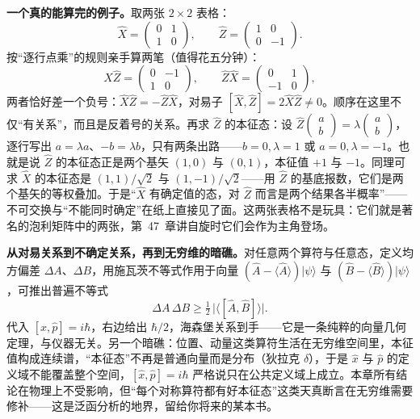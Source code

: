 \begin{mathbridge}
\textbf{一个真的能算完的例子。}取两张 $2\times2$ 表格：
\[
\hat{X}=\begin{pmatrix} 0 & 1 \\ 1 & 0 \end{pmatrix},\qquad
\hat{Z}=\begin{pmatrix} 1 & 0 \\ 0 & -1 \end{pmatrix}.
\]
按“逐行点乘”的规则亲手算两笔（值得花五分钟）：
\[
\hat{X}\hat{Z}=\begin{pmatrix} 0 & -1 \\ 1 & 0 \end{pmatrix},\qquad
\hat{Z}\hat{X}=\begin{pmatrix} 0 & 1 \\ -1 & 0 \end{pmatrix},
\]
两者恰好差一个负号：$\hat{X}\hat{Z}=-\hat{Z}\hat{X}$，对易子 $[\hat{X},\hat{Z}]=2\hat{X}\hat{Z}\neq0$。顺序在这里不仅“有关系”，而且是反着号的关系。再求 $\hat{Z}$ 的本征态：设 $\hat{Z}\begin{pmatrix}a\\b\end{pmatrix}=\lambda\begin{pmatrix}a\\b\end{pmatrix}$，逐行写出 $a=\lambda a$、$-b=\lambda b$，只有两条出路——$b=0,\lambda=1$ 或 $a=0,\lambda=-1$。也就是说 $\hat{Z}$ 的本征态正是两个基矢 $(1,0)$ 与 $(0,1)$，本征值 $+1$ 与 $-1$。同理可求 $\hat{X}$ 的本征态是 $(1,1)/\sqrt2$ 与 $(1,-1)/\sqrt2$——用 $\hat{Z}$ 的基底报数，它们是两个基矢的等权叠加。于是“$\hat{X}$ 有确定值的态，对 $\hat{Z}$ 而言是两个结果各半概率”——不可交换与“不能同时确定”在纸上直接见了面。这两张表格不是玩具：它们就是著名的泡利矩阵中的两张，第~47~章讲自旋时它们会作为主角登场。
\end{mathbridge}

\begin{challenge}
\textbf{从对易关系到不确定关系，再到无穷维的暗礁。}对任意两个算符与任意态，定义均方偏差 $\Delta A$、$\Delta B$，用施瓦茨不等式作用于向量 $(\hat{A}-\langle\hat{A}\rangle)|\psi\rangle$ 与 $(\hat{B}-\langle\hat{B}\rangle)|\psi\rangle$，可推出普遍不等式
\[
\Delta A\,\Delta B\geq\tfrac12\,\bigl|\langle[\hat{A},\hat{B}]\rangle\bigr|.
\]
代入 $[\hat{x},\hat{p}]=i\hbar$，右边给出 $\hbar/2$，海森堡关系到手——它是一条纯粹的向量几何定理，与仪器无关。另一个暗礁：位置、动量这类算符生活在无穷维空间里，本征值构成连续谱，“本征态”不再是普通向量而是分布（狄拉克 $\delta$），于是 $\hat{x}$ 与 $\hat{p}$ 的定义域不能覆盖整个空间，$[\hat{x},\hat{p}]=i\hbar$ 严格说只在公共定义域上成立。本章所有结论在物理上不受影响，但“每个对称算符都有好本征态”这类天真断言在无穷维需要修补——这是泛函分析的地界，留给你将来的某本书。
\end{challenge}

